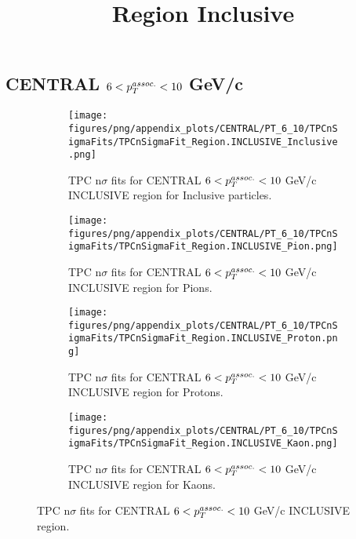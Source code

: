     
            \subsection{CENTRAL $6 < \pTassoc < 10$ GeV/c}
            \begin{figure}[H]
                \title{Region Inclusive}
                \begin{subfigure}[b]{0.5\textwidth}
                    \centering
                    \texttt{[image: figures/png/appendix\_plots/CENTRAL/PT\_6\_10/TPCnSigmaFits/TPCnSigmaFit\_Region.INCLUSIVE\_Inclusive.png]}
                    \caption{TPC n$\sigma$ fits for CENTRAL $6 < \pTassoc < 10$ GeV/c INCLUSIVE region for Inclusive particles.}
                    \label{fig:appendix_CENTRAL_$6 < \pTassoc < 10$ GeV/c_INCLUSIVE_Inclusive}
                \end{subfigure}
                \begin{subfigure}[b]{0.5\textwidth}
                    \centering
                    \texttt{[image: figures/png/appendix\_plots/CENTRAL/PT\_6\_10/TPCnSigmaFits/TPCnSigmaFit\_Region.INCLUSIVE\_Pion.png]}
                    \caption{TPC n$\sigma$ fits for CENTRAL $6 < \pTassoc < 10$ GeV/c INCLUSIVE region for Pions.}
                    \label{fig:appendix_CENTRAL_$6 < \pTassoc < 10$ GeV/c_INCLUSIVE_Pion}
                \end{subfigure}
                \begin{subfigure}[b]{0.5\textwidth}
                    \centering
                    \texttt{[image: figures/png/appendix\_plots/CENTRAL/PT\_6\_10/TPCnSigmaFits/TPCnSigmaFit\_Region.INCLUSIVE\_Proton.png]}
                    \caption{TPC n$\sigma$ fits for CENTRAL $6 < \pTassoc < 10$ GeV/c INCLUSIVE region for Protons.}
                    \label{fig:appendix_CENTRAL_$6 < \pTassoc < 10$ GeV/c_INCLUSIVE_Proton}
                \end{subfigure}
                \begin{subfigure}[b]{0.5\textwidth}
                    \centering
                    \texttt{[image: figures/png/appendix\_plots/CENTRAL/PT\_6\_10/TPCnSigmaFits/TPCnSigmaFit\_Region.INCLUSIVE\_Kaon.png]}
                    \caption{TPC n$\sigma$ fits for CENTRAL $6 < \pTassoc < 10$ GeV/c INCLUSIVE region for Kaons.}
                    \label{fig:appendix_CENTRAL_$6 < \pTassoc < 10$ GeV/c_INCLUSIVE_Kaon}
                \end{subfigure}
                \caption{TPC n$\sigma$ fits for CENTRAL $6 < \pTassoc < 10$ GeV/c INCLUSIVE region.}
                \label{fig:appendix_CENTRAL_$6 < \pTassoc < 10$ GeV/c_INCLUSIVE}
            \end{figure}
